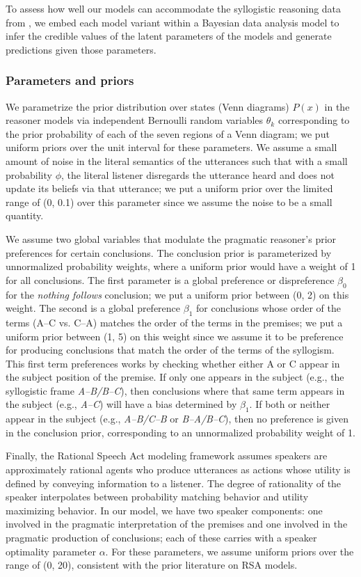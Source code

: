 \documentclass[floatsintext, doc]{apa6}
\begin{document}
To assess how well our models can accommodate the syllogistic reasoning data from , we embed each model variant within a Bayesian data analysis model to infer the credible values of the latent parameters of the models and generate predictions given those parameters. 

\subsubsection{Parameters and priors}

We parametrize the prior distribution over states (Venn diagrams) $P(x)$ in the reasoner models via independent Bernoulli random variables $\theta_k$ corresponding to the prior probability of each of the seven regions of a Venn diagram; we put uniform priors over the unit interval for these parameters.
We assume a small amount of noise in the literal semantics of the utterances such that with a small probability $\phi$, the literal listener disregards the utterance heard and does not update its beliefs via that utterance; we put a uniform prior over the limited range of (0, 0.1) over this parameter since we assume the noise to be a small quantity. 

We assume two global variables that modulate the pragmatic reasoner's prior preferences for certain conclusions. 
The conclusion prior is parameterized by unnormalized probability weights, where a uniform prior would have a weight of 1 for all conclusions. 
The first parameter is a global preference or dispreference $\beta_0$ for the \emph{nothing follows} conclusion; we put a uniform prior between (0, 2) on this weight. 
The second is a global preference  $\beta_1$ for conclusions whose order of the terms (A--C vs. C--A) matches the order of the terms in the premises; we put a uniform prior between (1, 5) on this weight since we assume it to be preference for producing conclusions that match the order of the terms of the syllogism. 
This first term preferences works by checking whether either A or C appear in the subject position of the premise.
If only one appears in the subject (e.g., the syllogistic frame \emph{A--B/B--C}), then conclusions where that same term appears in the subject (e.g., \emph{A--C}) will have a bias determined by $\beta_1$.
If both or neither appear in the subject (e.g., \emph{A--B/C--B} or \emph{B--A/B--C}), then no preference is given in the conclusion prior, corresponding to an unnormalized probability weight of 1. 

Finally, the Rational Speech Act modeling framework assumes speakers are approximately rational agents who produce utterances as actions whose utility is defined by conveying information to a listener. The degree of rationality of the speaker interpolates between probability matching behavior and utility maximizing behavior. 
In our model, we have two speaker components: one involved in the pragmatic interpretation of the premises and one involved in the pragmatic production of conclusions; each of these carries with a speaker optimality parameter $\alpha$. 
For these parameters, we assume uniform priors over the range of (0, 20), consistent with the prior literature on RSA models. 
\end{document}
